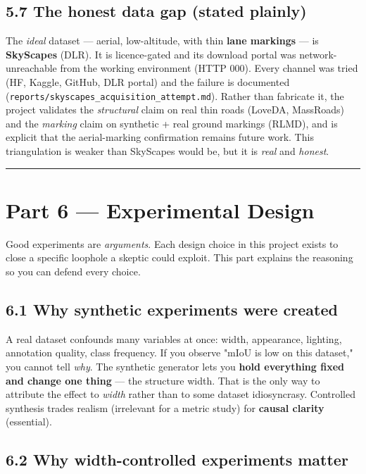 \documentclass[11pt]{article}
\begin{document}
\subsection*{5.7 The honest data gap (stated plainly)}

The \textit{ideal} dataset --- aerial, low-altitude, with thin \textbf{lane markings} --- is \textbf{SkyScapes} (DLR). It is licence-gated and its download portal was network- unreachable from the working environment (HTTP 000). Every channel was tried (HF, Kaggle, GitHub, DLR portal) and the failure is documented (\texttt{reports/skyscapes\_acquisition\_attempt.md}). Rather than fabricate it, the project validates the \textit{structural} claim on real thin roads (LoveDA, MassRoads) and the \textit{marking} claim on synthetic + real ground markings (RLMD), and is explicit that the aerial-marking confirmation remains future work. This triangulation is weaker than SkyScapes would be, but it is \textit{real} and \textit{honest}.

\vspace{3pt}\hrule\vspace{3pt}
\clearpage\section*{Part 6 --- Experimental Design}

Good experiments are \textit{arguments}. Each design choice in this project exists to close a specific loophole a skeptic could exploit. This part explains the reasoning so you can defend every choice.

\subsection*{6.1 Why synthetic experiments were created}

A real dataset confounds many variables at once: width, appearance, lighting, annotation quality, class frequency. If you observe "mIoU is low on this dataset," you cannot tell \textit{why}. The synthetic generator lets you \textbf{hold everything fixed and change one thing} --- the structure width. That is the only way to attribute the effect to \textit{width} rather than to some dataset idiosyncrasy. Controlled synthesis trades realism (irrelevant for a metric study) for \textbf{causal clarity} (essential).

\subsection*{6.2 Why width-controlled experiments matter}
\end{document}
